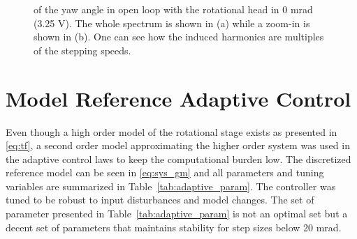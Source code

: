 \begin{figure}[h!]
  \centering %
  \qquad
  \caption{\label{fig:dist_diff_speed} \abbrFFT of the yaw angle in open loop with the rotational head in 0 mrad (3.25 V). The whole spectrum is shown in (a) while a zoom-in is shown in (b). One can see how the induced harmonics are multiples of the stepping speeds.}
\end{figure}

\newpage
\FloatBarrier
\section{Model Reference Adaptive Control}
Even though a high order model of the rotational stage exists as presented in \eqref{eq:tf}, a second order model approximating the higher order system was used in the adaptive control laws to keep the computational burden low. The discretized reference model can be seen in \eqref{eq:sys_gm} and all parameters and tuning variables are summarized in Table~\ref{tab:adaptive_param}. The controller was tuned to be robust to input disturbances and model changes. The set of parameter presented in Table~\ref{tab:adaptive_param} is not an optimal set but a decent set of parameters that maintains stability for step sizes below 20 mrad.


